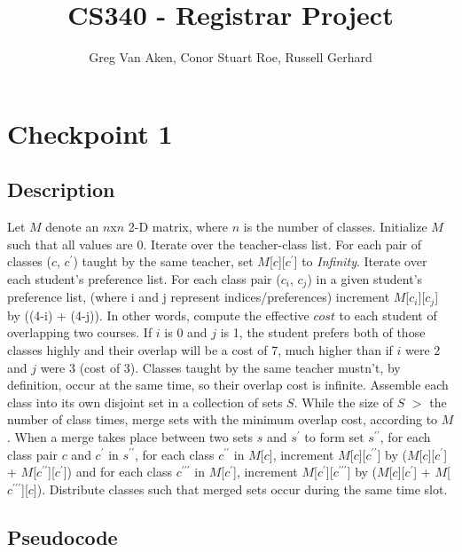 \documentclass[11pt, oneside]{article}   	%
\title{CS340 - Registrar Project}
\author{Greg Van Aken, Conor Stuart Roe, Russell Gerhard}
\begin{document}
\maketitle

\section{Checkpoint 1}
\subsection{Description}
Let $M$ denote an $n$x$n$ 2-D matrix, where $n$ is the number of classes. Initialize $M$ such that all values are 0. Iterate over the teacher-class list. For each pair of classes ($c$, $c^\prime$) taught by the same teacher, set $M$[$c$][$c^\prime$] to {\it Infinity}. Iterate over each student's preference list. For each class pair ($c_i$, $c_j$) in a given student's preference list, (where i and j represent indices/preferences) increment $M$[$c_i$][$c_j$] by ((4-i) + (4-j)). In other words, compute the effective $cost$ to each student of overlapping two courses. If $i$ is 0 and $j$ is 1, the student prefers both of those classes highly and their overlap will be a cost of 7, much higher than if $i$ were 2 and $j$ were 3 (cost of 3). Classes taught by the same teacher mustn't, by definition, occur at the same time, so their overlap cost is infinite. Assemble each class into its own disjoint set in a collection of sets $S$. While the size of $S$ $>$ the number of class times, merge sets with the minimum overlap cost, according to $M$. When a merge takes place between two sets $s$ and $s^\prime$ to form set $s^{\prime\prime}$, for each class pair $c$ and $c^\prime$ in $s^{\prime\prime}$, for each class $c^{\prime\prime}$ in $M$[$c$], increment $M$[$c$][$c^{\prime\prime}$] by ($M$[$c$][$c^\prime$] + $M$[$c^{\prime\prime}$][$c^\prime$]) and for each class $c^{\prime\prime\prime}$ in $M$[$c^\prime$], increment $M$[$c^\prime$][$c^{\prime\prime\prime}$] by ($M$[$c$][$c^{\prime}$] + $M$[$c^{\prime\prime\prime}$][$c$]). Distribute classes such that merged sets occur during the same time slot.

\subsection{Pseudocode}
\begin{algorithm}
\end{algorithm}
\end{document}

